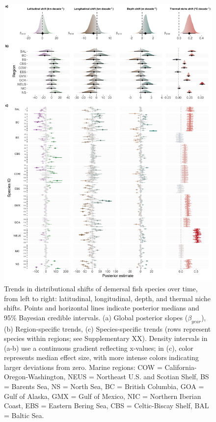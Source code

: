 \documentclass[11pt]{article}
\begin{document}
\begin{spacing}{1.5}
\begin{figure}[h]
    \centering
    \includegraphics[scale=0.58]{images/slopes.png}
\caption{Trends in distributional shifts of demersal fish species over time, from left to right: latitudinal, longitudinal, depth, and thermal niche shifts. Points and horizontal lines indicate posterior medians and 95\% Bayesian credible intervals.  
(a) Global posterior slopes ($\beta_{year}$),  
(b) Region-specific trends,  
(c) Species-specific trends (rows represent species within regions; see Supplementary XX).  
Density intervals in (a-b) use a continuous gradient reflecting x-values; in (c), color represents median effect size, with more intense colors indicating larger deviations from zero.  
Marine regions: COW = California-Oregon-Washington, NEUS = Northeast U.S. and Scotian Shelf, BS = Barents Sea, NS = North Sea, BC = British Columbia, GOA = Gulf of Alaska, GMX = Gulf of Mexico, NIC = Northern Iberian Coast, EBS = Eastern Bering Sea, CBS = Celtic-Biscay Shelf, BAL = Baltic Sea.}
    \label{fig:effsize}
\end{figure}



\end{spacing}
\end{document}
